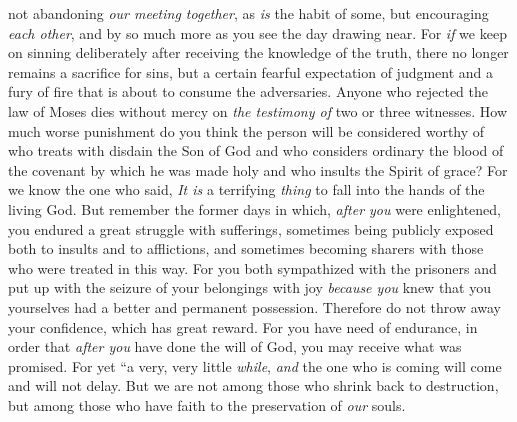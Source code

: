 \begin{biblechapter}
\verse not abandoning \textit{our meeting together}, as \textit{is} the habit of some, but encouraging \textit{each other}, and by so much more as you see the day drawing near.
 For \textit{if} we keep on sinning deliberately after receiving the knowledge of the truth, there no longer remains a sacrifice for sins,
\verse but a certain fearful expectation of judgment and a fury of fire that is about to consume the adversaries.
\verse Anyone who rejected the law of Moses dies without mercy on \textit{the testimony of} two or three witnesses.
\verse How much worse punishment do you think the person will be considered worthy of who treats with disdain the Son of God and who considers ordinary the blood of the covenant by which he was made holy and who insults the Spirit of grace?
\verse For we know the one who said,
\verse \textit{It is} a terrifying \textit{thing} to fall into the hands of the living God.
\verse But remember the former days in which, \textit{after you} were enlightened, you endured a great struggle with sufferings,
\verse sometimes being publicly exposed both to insults and to afflictions, and sometimes becoming sharers with those who were treated in this way.
\verse For you both sympathized with the prisoners and put up with the seizure of your belongings with joy \textit{because you} knew that you yourselves had a better and permanent possession.
\verse Therefore do not throw away your confidence, which has great reward.
\verse For you have need of endurance, in order that \textit{after you} have done the will of God, you may receive what was promised.
\verse For yet
\verse “a very, very little \textit{while}, 
\textit{and} the one who is coming will come and will not delay.
\verse But we are not among those who shrink back to destruction, but among those who have faith to the preservation of \textit{our} souls.
\end{biblechapter}

